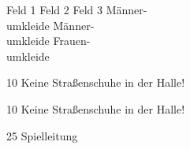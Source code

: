 \documentclass[]{article}
\begin{document}
\begin{landscape}
\vspace*{\fill}
{\fontsize{400}{120} \selectfont Feld 1}
\vspace*{\fill}
\newpage
\vspace*{\fill}
{\fontsize{400}{120} \selectfont Feld 2}
\vspace*{\fill}
\newpage
\vspace*{\fill}
{\fontsize{400}{120} \selectfont Feld 3}
\vspace*{\fill}
\newpage
\vspace*{\fill}
{\fontsize{250}{200} \selectfont Männer-\\umkleide}
\vspace*{\fill}
\newpage
\vspace*{\fill}
{\fontsize{250}{200} \selectfont Männer-\\umkleide}
\vspace*{\fill}
\newpage
\vspace*{\fill}
{\fontsize{250}{200} \selectfont Frauen-\\umkleide}
\vspace*{\fill}
\newpage
\vspace*{\fill}
\begin{spacing}{10}
{\fontsize{200}{200} \selectfont Keine Straßenschuhe in der Halle!}
\end{spacing}
\vspace*{\fill}
\newpage
\vspace*{\fill}
\begin{spacing}{10}
{\fontsize{200}{200} \selectfont Keine Straßenschuhe in der Halle!}
\end{spacing}
\vspace*{\fill}
\newpage
\vspace*{\fill}
\begin{spacing}{25}
{\fontsize{200}{200} \selectfont Spielleitung}
\end{spacing}
\vspace*{\fill}
\end{landscape}
\end{document}
